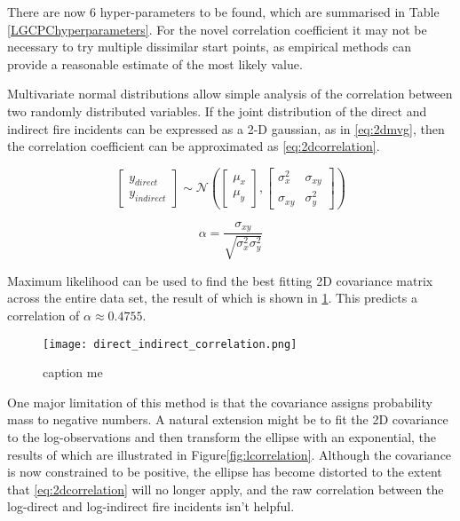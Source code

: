 \documentclass[a4paper,11pt]{report}
\begin{document}
There are now 6 hyper-parameters to be found, which are summarised in Table \ref{LGCPChyperparameters}. For the novel correlation coefficient it may not be necessary to try multiple dissimilar start points, as empirical methods can provide a reasonable estimate of the most likely value.

Multivariate normal distributions allow simple analysis of the correlation between two randomly distributed variables. If the joint distribution of the direct and indirect fire incidents can be expressed as a 2-D gaussian, as in \ref{eq:2dmvg}, then the correlation coefficient can be approximated as \ref{eq:2dcorrelation}.

\begin{equation} \label{eq:2dmvg}
\left[ \begin{array}{cc}
y_{direct} \\
y_{indirect} \end{array} \right]
\sim
\mathcal{N} \left( \left[ \begin{array}{cc}
\mu_x \\
\mu_y \end{array} \right], \left[ \begin{array}{cc}
\sigma_{x}^2 & \sigma_{xy} \\
\sigma_{xy} & \sigma_{y}^2  \end{array} \right] \right)
\end{equation}

\begin{equation} \label{eq:2dcorrelation}
\alpha = \frac{\sigma_{xy}}{\sqrt{\sigma_{x}^2 \sigma_{y}^2}}
\end{equation}

Maximum likelihood can be used to find the best fitting 2D covariance matrix across the entire data set, the result of which is shown in \ref{fig:correlation}. This predicts a correlation of \(\alpha \approx 0.4755\).

\begin{figure}
\centering
\texttt{[image: direct\_indirect\_correlation.png]}
\caption{caption me}
\label{fig:correlation}
\end{figure}


One major limitation of this method is that the covariance assigns probability mass to negative numbers. A natural extension might be to fit the 2D covariance to the log-observations and then transform the ellipse with an exponential, the results of which are illustrated in Figure\ref{fig:lcorrelation}. Although the covariance is now constrained to be positive, the ellipse has become distorted to the extent that \ref{eq:2dcorrelation} will no longer apply, and the raw correlation between the log-direct and log-indirect fire incidents isn't helpful.
\end{document}
